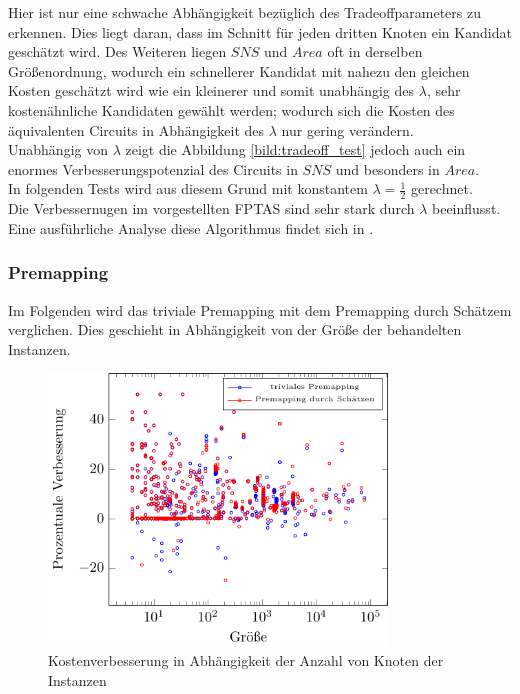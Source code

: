 \documentclass[11pt, a4paper, german]{article}
\begin{document}
Hier ist nur eine schwache Abh\"angigkeit bez\"uglich des Tradeoffparameters zu erkennen. Dies liegt daran, dass im Schnitt f\"ur jeden dritten Knoten ein Kandidat gesch\"atzt wird. Des Weiteren liegen $SNS$ und $Area$ oft in derselben Gr\"o\ss enordnung, wodurch ein schnellerer Kandidat mit nahezu den gleichen Kosten gesch\"atzt wird wie ein kleinerer und somit unabhängig des $\lambda$, sehr kosten\"ahnliche Kandidaten gew\"ahlt werden; wodurch sich die Kosten des \"aquivalenten Circuits in Abh\"angigkeit des $\lambda$ nur gering ver\"andern.\\
Unabh\"angig von $\lambda$ zeigt die Abbildung \ref{bild:tradeoff_test} jedoch auch ein enormes Verbesserungspotenzial des Circuits in $SNS$ und besonders in $Area$.\\
In folgenden Tests wird aus diesem Grund mit konstantem $\lambda = \frac{1}{2}$ gerechnet.\\

Die Verbessernugen im vorgestellten FPTAS sind sehr stark durch $\lambda$ beeinflusst. Eine ausf\"uhrliche Analyse diese Algorithmus findet sich in \cite{Elbert}.


\subsubsection{Premapping}
Im Folgenden wird das triviale Premapping mit dem Premapping durch Sch\"atzem verglichen. Dies geschieht in Abh\"angigkeit von der Gr\"o{\ss}e der behandelten Instanzen. \\
\begin{figure}[h]
		\centering
		\includegraphics[width = 9cm]{pictures/tex_files/analysis/prem_test}
		\caption{Kostenverbesserung in Abh\"angigkeit der Anzahl von Knoten der Instanzen}
		\label{bild:prem_test}
\end{figure}
\end{document}
